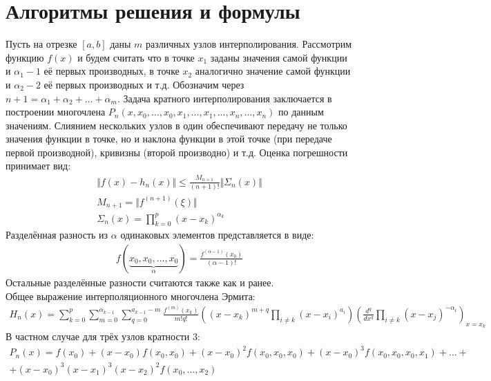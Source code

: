 \documentclass[10pt]{scrartcl}
\begin{document}
\section*{Алгоритмы решения и формулы}\noindent
Пусть на отрезке $[a, b]$ даны $m$ различных узлов интерполирования. Рассмотрим функцию $f(x)$ и
будем считать что в точке $x_1$ заданы значения самой функции и $\alpha_1 - 1$ её первых производных,
в точке $x_2$ аналогично значение самой функции и $\alpha_2 - 2$ её первых производных и т.д.
Обозначим через $n + 1 = \alpha_1 + \alpha_2 + \dots + \alpha_m$. Задача кратного интерполирования
заключается в построении многочлена $P_n(x, x_0, \dots, x_0, x_1, \dots, x_1, \dots, x_n, \dots, x_n)
$ по данным значениям. Слиянием нескольких узлов в один обеспечивают передачу не только значения
функции в точке, но и наклона функции в этой точке (при передаче первой производной), кривизны
(второй производно) и т.д.
Оценка погрешности принимает вид:
\begin{gather*}
\Vert f(x) - h_n(x) \Vert \leq \frac{M_{n + 1}}{(n + 1)!} \Vert\Sigma_n(x)\Vert\\
M_{n + 1} = \Vert f^{(n+1)}(\xi)\Vert\\
\Sigma_n(x)=\prod_{k=0}^{p}(x - x_k)^{\alpha_k}
\end{gather*}
Разделённая разность из $\alpha$ одинаковых элементов представляется в виде:
\begin{gather*}
f(\underbrace{x_0, x_0, \dots, x_0}_{\alpha}) = \frac{f^{(\alpha - 1)}(x_0)}
{(\alpha - 1)!}
\end{gather*}
Остальные разделённые разности считаются также как и ранее.\\
Общее выражение интерполяционного многочлена Эрмита:
\begin{gather*}
H_n(x) = \sum_{k = 0}^p \sum_{m = 0}^{\alpha_{k - 1}} \sum_{q = 0}^{a_{k - 1} - m}
\frac{f^{(m)}(x_k)}{m!q!}\left( (x - x_k)^{m  + q}\prod_{i \neq k}(x - x_i)^{a_i}\right)
\left(\frac{d^q}{dx^q}\prod_{i \neq k}(x - x_j)^{-\alpha_i}\right)_{x=x_k}
\end{gather*}
В частном случае для трёх узлов кратности 3:
\begin{gather*}
P_n(x) = f(x_0) + (x - x_0)f(x_0, x_0) + (x - x_0)^2f(x_0, x_0, x_0) +
(x - x_0)^3f(x_0, x_0, x_0, x_1) + \dots + \\ +(x - x_0)^3(x - x_1)^3(x - x_2)^2
f(x_0, \dots, x_2)
\end{gather*}
\end{document}
